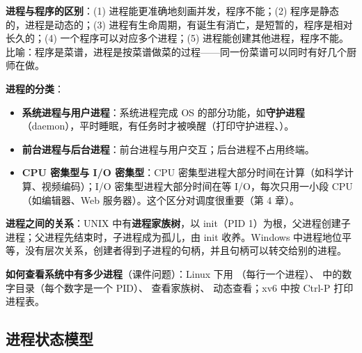 \textbf{进程与程序的区别}：(1) 进程能更准确地刻画并发，程序不能；(2) 程序是静态的，进程是动态的；(3) 进程有生命周期，有诞生有消亡，是短暂的，程序是相对长久的；(4) 一个程序可以对应多个进程；(5) 进程能创建其他进程，程序不能。比喻：程序是菜谱，进程是按菜谱做菜的过程——同一份菜谱可以同时有好几个厨师在做。

\textbf{进程的分类}：
\begin{itemize}
    \item \textbf{系统进程与用户进程}：系统进程完成 OS 的部分功能，如\textbf{守护进程}（daemon），平时睡眠，有任务时才被唤醒（打印守护进程、）。
    \item \textbf{前台进程与后台进程}：前台进程与用户交互；后台进程不占用终端。
    \item \textbf{CPU 密集型与 I/O 密集型}：CPU 密集型进程大部分时间在计算（如科学计算、视频编码）；I/O 密集型进程大部分时间在等 I/O，每次只用一小段 CPU（如编辑器、Web 服务器）。这个区分对调度很重要（第 4 章）。
\end{itemize}
\textbf{进程之间的关系}：UNIX 中有\textbf{进程家族树}，以 init（PID 1）为根，父进程创建子进程；父进程先结束时，子进程成为孤儿，由 init 收养。Windows 中进程地位平等，没有层次关系，创建者得到子进程的句柄，并且句柄可以转交给别的进程。

\textbf{如何查看系统中有多少进程}（课件问题）：Linux 下用 （每行一个进程）、 中的数字目录（每个数字是一个 PID）、 查看家族树、 动态查看；xv6 中按 Ctrl-P 打印进程表。

\subsection{进程状态模型}

\begin{center}
\end{center}

